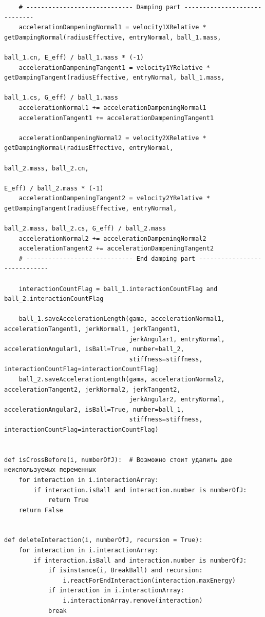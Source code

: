 \documentclass[utf8x, 14pt, oneside, a4paper]{article}
\begin{document}
\begin{lstlisting}
    # ----------------------------- Damping part -----------------------------
    accelerationDampeningNormal1 = velocity1XRelative * getDampingNormal(radiusEffective, entryNormal, ball_1.mass,
                                                                         ball_1.cn, E_eff) / ball_1.mass * (-1)
    accelerationDampeningTangent1 = velocity1YRelative * getDampingTangent(radiusEffective, entryNormal, ball_1.mass,
                                                                           ball_1.cs, G_eff) / ball_1.mass
    accelerationNormal1 += accelerationDampeningNormal1
    accelerationTangent1 += accelerationDampeningTangent1

    accelerationDampeningNormal2 = velocity2XRelative * getDampingNormal(radiusEffective, entryNormal,
                                                                         ball_2.mass, ball_2.cn,
                                                                         E_eff) / ball_2.mass * (-1)
    accelerationDampeningTangent2 = velocity2YRelative * getDampingTangent(radiusEffective, entryNormal,
                                                                           ball_2.mass, ball_2.cs, G_eff) / ball_2.mass
    accelerationNormal2 += accelerationDampeningNormal2
    accelerationTangent2 += accelerationDampeningTangent2
    # ----------------------------- End damping part -----------------------------

    interactionCountFlag = ball_1.interactionCountFlag and ball_2.interactionCountFlag

    ball_1.saveAccelerationLength(gama, accelerationNormal1, accelerationTangent1, jerkNormal1, jerkTangent1,
                                  jerkAngular1, entryNormal, accelerationAngular1, isBall=True, number=ball_2,
                                  stiffness=stiffness, interactionCountFlag=interactionCountFlag)
    ball_2.saveAccelerationLength(gama, accelerationNormal2, accelerationTangent2, jerkNormal2, jerkTangent2,
                                  jerkAngular2, entryNormal, accelerationAngular2, isBall=True, number=ball_1,
                                  stiffness=stiffness, interactionCountFlag=interactionCountFlag)


def isCrossBefore(i, numberOfJ):  # Возможно стоит удалить две неиспользуемых переменных
    for interaction in i.interactionArray:
        if interaction.isBall and interaction.number is numberOfJ:
            return True
    return False


def deleteInteraction(i, numberOfJ, recursion = True):
    for interaction in i.interactionArray:
        if interaction.isBall and interaction.number is numberOfJ:
            if isinstance(i, BreakBall) and recursion:
                i.reactForEndInteraction(interaction.maxEnergy)
            if interaction in i.interactionArray:
                i.interactionArray.remove(interaction)
            break



\end{lstlisting}
\end{document}
